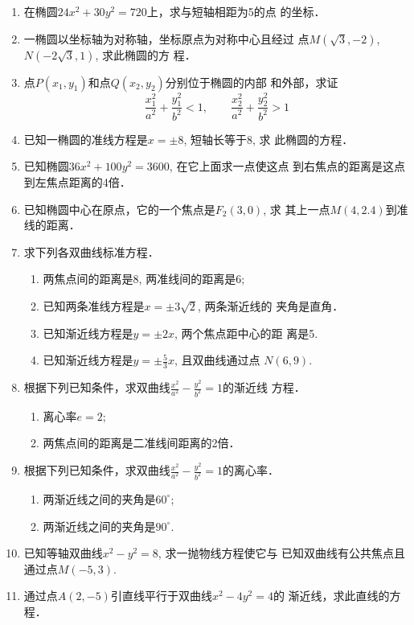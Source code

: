 \begin{enumerate}
\item 在椭圆$24x^2+30y^2=720$上，求与短轴相距为5的点
的坐标．
\item 一椭圆以坐标轴为对称轴，坐标原点为对称中心且经过
点$M(\sqrt{3},-2)$, $N(-2\sqrt{3},1)$, 求此椭圆的方
程．
\item 点$P(x_1,y_1)$和点$Q(x_2,y_2)$分别位于椭圆的内部
和外部，求证
\[\frac{x_1^2}{a^2}+\frac{y_1^2}{b^2}<1,\qquad \frac{x_2^2}{a^2}+\frac{y_2^2}{b^2}>1\]
\item 已知一椭圆的准线方程是$x=\pm 8$, 短轴长等于8, 求
此椭圆的方程．
\item 已知椭圆$36x^2+100y^2=3600$, 在它上面求一点使这点
到右焦点的距离是这点到左焦点距离的4倍．
\item 已知椭圆中心在原点，它的一个焦点是$F_2(3,0)$, 求
其上一点$M(4,2.4)$到准线的距离．
\item 求下列各双曲线标准方程．
\begin{enumerate}
\item 两焦点间的距离是8, 两准线间的距离是6;
\item 已知两条准线方程是$x=\pm 3\sqrt{2}$, 两条渐近线的
夹角是直角．
\item 已知渐近线方程是$y=\pm 2x$, 两个焦点距中心的距
离是5.
\item 已知渐近线方程是$y=\pm \frac{5}{3}x$, 且双曲线通过点
$N(6,9)$.
\end{enumerate}

\item 根据下列已知条件，求双曲线$\frac{x^2}{a^2}-\frac{y^2}{b^2}=1$的渐近线
方程．
\begin{enumerate}
    \item 离心率$e=2$; 
    \item 两焦点间的距离是二准线间距离的2倍．
\end{enumerate}

\item 根据下列已知条件，求双曲线$\frac{x^2}{a^2}-\frac{y^2}{b^2}=1$的离心率．
\begin{enumerate}
    \item 两渐近线之间的夹角是$60^{\circ}$;
    \item 两渐近线之间的夹角是$90^{\circ}$.
\end{enumerate}

\item 已知等轴双曲线$x^2-y^2=8$, 求一抛物线方程使它与
已知双曲线有公共焦点且通过点$M(-5,3)$.
\item 通过点$A(2,-5)$引直线平行于双曲线$x^2-4y^2=4$的
渐近线，求此直线的方程．


\end{enumerate}
